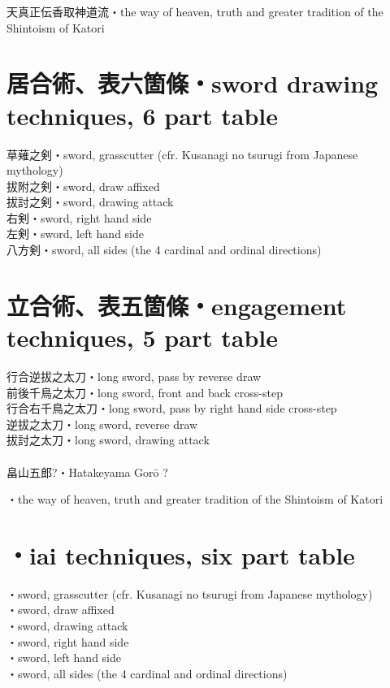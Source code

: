 \documentclass[dvipdfmx, a4paper, 12pt]{utarticle}
\begin{document}
\begin{CJK*}{UTF8}{min}
\begin{landscape}
\setcounter{section}{0}
\newpage
\pagestyle{empty}
天真正伝香取神道流・the way of heaven, truth and greater tradition of the Shintoism of Katori
\section{居合術、表六箇條・sword drawing techniques, 6 part table}
\noindent 草薙之剣・sword, grasscutter (cfr. Kusanagi no tsurugi from Japanese mythology)\\
拔附之剣・sword, draw affixed\\
拔討之剣・sword, drawing attack\\
右剣・sword, right hand side\\
左剣・sword, left hand side\\
八方剣・sword, all sides (the 4 cardinal and ordinal directions)\\
\section{立合術、表五箇條・engagement techniques, 5 part table}
\noindent 行合逆拔之太刀・long sword, pass by reverse draw\\
前後千鳥之太刀・long sword, front and back cross-step\\
行合右千鳥之太刀・long sword, pass by right hand side cross-step\\
逆拔之太刀・long sword, reverse draw\\
拔討之太刀・long sword, drawing attack\\
\\
畠山五郎?・Hatakeyama Gor\={o} ?


\setcounter{section}{0}
\newpage
\pagestyle{empty}
・the way of heaven, truth and greater tradition of the Shintoism of Katori\\
\section{・iai techniques, six part table}
\noindent {}・sword, grasscutter (cfr. Kusanagi no tsurugi from Japanese mythology)\\
・sword, draw affixed\\
・sword, drawing attack\\
・sword, right hand side\\
・sword, left hand side\\
・sword, all sides (the 4 cardinal and ordinal directions)\\

\end{landscape}
\end{CJK*}
\end{document}
